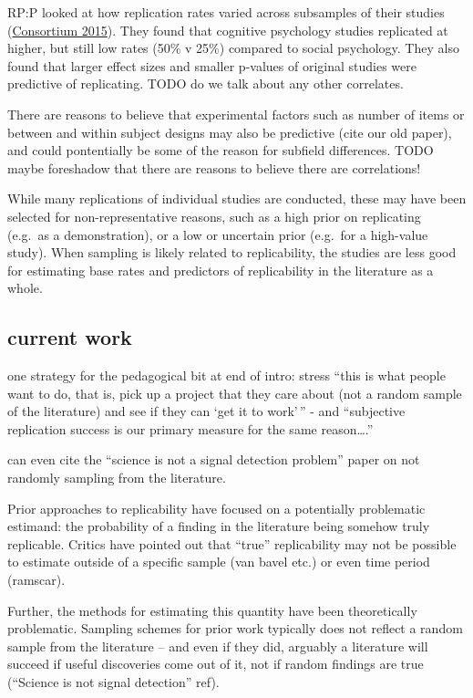 \documentclass[
  english,
  a4paper,
]{article}
\begin{document}
RP:P looked at how replication rates varied across subsamples of their studies (\protect\hyperlink{ref-openscienceconsortium2015}{Consortium 2015}). They found that cognitive psychology studies replicated at higher, but still low rates (50\% v 25\%) compared to social psychology. They also found that larger effect sizes and smaller p-values of original studies were predictive of replicating. TODO do we talk about any other correlates.

There are reasons to believe that experimental factors such as number of items or between and within subject designs may also be predictive (cite our old paper), and could pontentially be some of the reason for subfield differences. TODO maybe foreshadow that there are reasons to believe there are correlations!

While many replications of individual studies are conducted, these may have been selected for non-representative reasons, such as a high prior on replicating (e.g.~as a demonstration), or a low or uncertain prior (e.g.~for a high-value study). When sampling is likely related to replicability, the studies are less good for estimating base rates and predictors of replicability in the literature as a whole.

\hypertarget{current-work}{%
\subsection{current work}\label{current-work}}

one strategy for the pedagogical bit at end of intro: stress ``this is what people want to do, that is, pick up a project that they care about (not a random sample of the literature) and see if they can `get it to work'\,'' - and ``subjective replication success is our primary measure for the same reason\ldots.''

can even cite the ``science is not a signal detection problem'' paper on not randomly sampling from the literature.

Prior approaches to replicability have focused on a potentially problematic estimand: the probability of a finding in the literature being somehow truly replicable. Critics have pointed out that ``true'' replicability may not be possible to estimate outside of a specific sample (van bavel etc.) or even time period (ramscar).

Further, the methods for estimating this quantity have been theoretically problematic. Sampling schemes for prior work typically does not reflect a random sample from the literature -- and even if they did, arguably a literature will succeed if useful discoveries come out of it, not if random findings are true (``Science is not signal detection'' ref).
\end{document}
